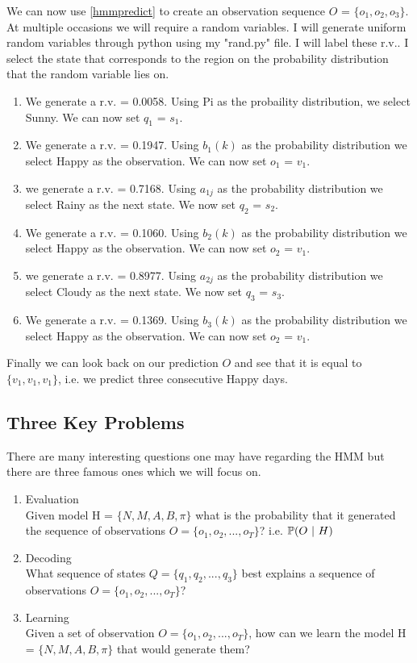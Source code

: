 \begin{example}
    We can now use \ref{hmmpredict} to create an observation sequence $O$ = $\{o_1, o_2, o_3\}$. At multiple occasions we will require a random variables. I will generate uniform random variables through python using my "rand.py" file. I will label these r.v.. I select the state that corresponds to the region on the probability distribution that the random variable lies on.
    \begin{enumerate}
        \item We generate a r.v. = 0.0058. Using Pi as the probaility distribution, we select Sunny. We can now set $q_1$ = $s_1$.
        \item We generate a r.v. = 0.1947. Using $b_1(k)$ as the probability distribution we select Happy as the observation. We can now set $o_1$ = $v_1$.
        \item we generate a r.v. = 0.7168. Using $a_{1j}$ as the probability distribution we select Rainy as the next state. We now set $q_2$ = $s_2$.
        \item We generate a r.v. = 0.1060. Using $b_2(k)$ as the probability distribution we select Happy as the observation. We can now set $o_2$ = $v_1$.
        \item we generate a r.v. = 0.8977. Using $a_{2j}$ as the probability distribution we select Cloudy as the next state. We now set $q_3$ = $s_3$.
        \item We generate a r.v. = 0.1369. Using $b_3(k)$ as the probability distribution we select Happy as the observation. We can now set $o_2$ = $v_1$.
    \end{enumerate}
    Finally we can look back on our prediction $O$ and see that it is equal to $\{v_1,v_1,v_1\}$, i.e. we predict three consecutive Happy days.
\end{example}


\subsection{Three Key Problems}
There are many interesting questions one may have regarding the HMM but there are three famous ones which we will focus on. 
\begin{enumerate}
    \item \label{q:first} Evaluation \\ Given model H = $\{N,M,A,B,\pi\}$ what is the probability that it generated the sequence of observations $O = \{o_1,o_2,...,o_T\}$? i.e. $\mathbb{P} (O \ | \ H)$
    \item \label{q:second} Decoding \\ What sequence of states $Q = \{q_1, q_2,..., q_3\}$ best explains a sequence of observations $O = \{o_1,o_2,...,o_T\}$?
    \item \label{q:third} Learning \\ Given a set of observation $O = \{o_1,o_2,...,o_T\}$, how can we learn the model H = $\{N,M,A,B,\pi\}$ that would generate them?
\end{enumerate}

